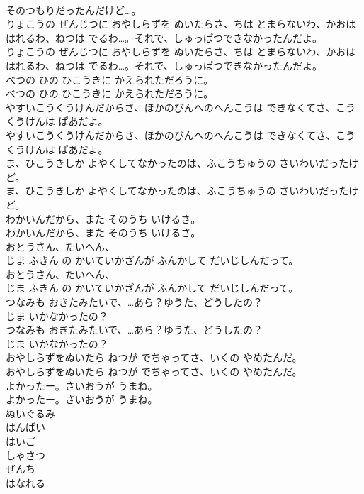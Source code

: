 \documentclass[8pt]{extreport}
\begin{document}
\begin{CJK}{UTF8}{min}
\\	そのつもりだったんだけど…。
\\	りょこうの ぜんじつに おやしらずを ぬいたらさ、ちは とまらないわ、かおは はれるわ、ねつは でるわ…。それで、しゅっぱつできなかったんだよ。
\\	りょこうの ぜんじつに おやしらずを ぬいたらさ、ちは とまらないわ、かおは はれるわ、ねつは でるわ…。それで、しゅっぱつできなかったんだよ。
\\	べつの ひの ひこうきに かえられただろうに。
\\	べつの ひの ひこうきに かえられただろうに。
\\	やすいこうくうけんだからさ、ほかのびんへのへんこうは できなくてさ、こうくうけんは ぱあだよ。
\\	やすいこうくうけんだからさ、ほかのびんへのへんこうは できなくてさ、こうくうけんは ぱあだよ。
\\	ま、ひこうきしか よやくしてなかったのは、ふこうちゅうの さいわいだったけど。
\\	ま、ひこうきしか よやくしてなかったのは、ふこうちゅうの さいわいだったけど。
\\	わかいんだから、また そのうち いけるさ。
\\	わかいんだから、また そのうち いけるさ。
\\	おとうさん、たいへん、
\\	じま ふきん の かいていかざんが ふんかして だいじしんだって。
\\	おとうさん、たいへん、
\\	じま ふきん の かいていかざんが ふんかして だいじしんだって。
\\	つなみも おきたみたいで、…あら？ゆうた、どうしたの？
\\	じま いかなかったの？
\\	つなみも おきたみたいで、…あら？ゆうた、どうしたの？
\\	じま いかなかったの？
\\	おやしらずをぬいたら ねつが でちゃってさ、いくの やめたんだ。
\\	おやしらずをぬいたら ねつが でちゃってさ、いくの やめたんだ。
\\	よかったー。さいおうが うまね。
\\	よかったー。さいおうが うまね。
\\	ぬいぐるみ
\\	はんばい
\\	はいご
\\	しゃさつ
\\	ぜんち
\\	はなれる

\end{CJK}
\end{document}
